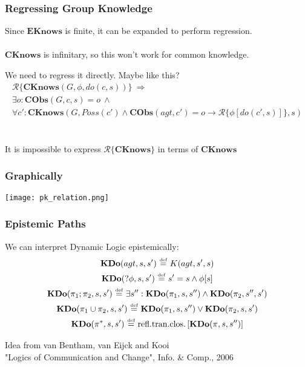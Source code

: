\documentclass{beamer}
\newcommand{\isdef}{\hbox{$\stackrel{\mbox{\tiny def}}{=}$}}
\begin{document}
\begin{frame}
\frametitle{Regressing Group Knowledge}
Since $\mathbf{EKnows}$ is finite, it can be expanded to perform regression.
\ \\
\ \\
$\mathbf{CKnows}$ is infinitary, so this won't work for common knowledge.

We need to regress it directly.  Maybe like this?
\begin{multline*}
\mathcal{R}\{\mathbf{CKnows}(G,\phi,do(c,s))\}\ \Rightarrow \\
\exists o: \mathbf{CObs}(G,c,s)=o\ \wedge\\
\forall c': \mathbf{CKnows}(G,Poss(c') \wedge \mathbf{CObs}(agt,c')=o \rightarrow \mathcal{R}\{\phi[do(c',s)]\},s)
\end{multline*}
\ \\
\ \\
\pause
It is \alert{impossible} to express $\mathcal{R}\{\mathbf{CKnows}\}$ in terms of $\mathbf{CKnows}$
\end{frame}

\begin{frame}
\frametitle{Graphically}
\begin{center}
  \texttt{[image: pk\_relation.png]}
\end{center}
\end{frame}

\begin{frame}
\frametitle{Epistemic Paths}
We can interpret Dynamic Logic epistemically:
\begin{gather*}
\mathbf{KDo}(agt,s,s')\ \isdef\ K(agt,s',s)\\
\mathbf{KDo}(?\phi,s,s')\ \isdef\ s'=s \wedge \phi[s]\\
\mathbf{KDo}(\pi_1;\pi_2,s,s')\ \isdef\ \exists s'': \mathbf{KDo}(\pi_1,s,s'') \wedge \mathbf{KDo}(\pi_2,s'',s')\\
\mathbf{KDo}(\pi_1\cup\pi_2,s,s')\ \isdef\ \mathbf{KDo}(\pi_1,s,s'') \vee \mathbf{KDo}(\pi_2,s,s')\\
\mathbf{KDo}(\pi^*,s,s')\ \isdef\ \mathrm{refl. tran. clos.}\left[\mathbf{KDo}(\pi,s,s'')\right]\\
\end{gather*}

Idea from van Bentham, van Eijck and Kooi\\
"Logics of Communication and Change", Info. \& Comp., 2006
\end{frame}
\end{document}
